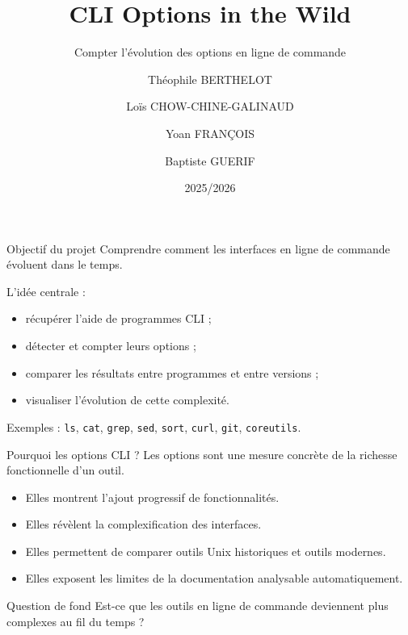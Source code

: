 \documentclass[10pt,aspectratio=169]{beamer}
\title{CLI Options in the Wild}
\subtitle{Compter l'évolution des options en ligne de commande}
\author{
  Théophile BERTHELOT \and
  Loïs CHOW-CHINE-GALINAUD \and
  Yoan FRANÇOIS \and
  Baptiste GUERIF
}
\institute{Projet PROJ104 -- Encadrante : Xhevahire TËRNAVA}
\date{2025/2026}
\begin{document}
\begin{frame}
  \titlepage
\end{frame}

\begin{frame}{Objectif du projet}
  Comprendre comment les interfaces en ligne de commande évoluent dans le temps.

  \vspace{0.4cm}
  L'idée centrale :
  \begin{itemize}
    \item récupérer l'aide de programmes CLI ;
    \item détecter et compter leurs options ;
    \item comparer les résultats entre programmes et entre versions ;
    \item visualiser l'évolution de cette complexité.
  \end{itemize}

  \vspace{0.2cm}
  Exemples : \texttt{ls}, \texttt{cat}, \texttt{grep}, \texttt{sed}, \texttt{sort}, \texttt{curl}, \texttt{git}, \texttt{coreutils}.
\end{frame}

\begin{frame}{Pourquoi les options CLI ?}
  Les options sont une mesure concrète de la richesse fonctionnelle d'un outil.

  \begin{itemize}
    \item Elles montrent l'ajout progressif de fonctionnalités.
    \item Elles révèlent la complexification des interfaces.
    \item Elles permettent de comparer outils Unix historiques et outils modernes.
    \item Elles exposent les limites de la documentation analysable automatiquement.
  \end{itemize}

  \vspace{0.4cm}
  \begin{block}{Question de fond}
    Est-ce que les outils en ligne de commande deviennent plus complexes au fil du temps ?
  \end{block}
\end{frame}
\end{document}

